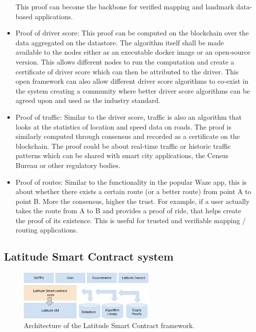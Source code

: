 \begin{itemize}
         This proof can become the backbone for verified mapping and landmark data-based applications.
     \item Proof of driver score: This proof can be computed on the blockchain over the data aggregated on the
         datastore. The algorithm itself shall be made available to the nodes either as an executable docker image or an
         open-source version. This allows different nodes to run the computation and create a certificate of 
         driver score which can then be attributed to the driver. This open framework can also allow different
         driver score algorithms to co-exist in the system creating a community where better driver score algorithms can
         be agreed upon and used as the industry standard.
     \item Proof of traffic:  Similar to the driver score, traffic is also an algorithm that looks at the statistics of
         location and speed data on roads. The proof is similarly computed through consensus and recorded as a
         certificate on the blockchain. The proof could be about real-time traffic or historic traffic patterns which
         can be shared with smart city applications, the Census Bureau or other regulatory bodies.
     \item Proof of routes: Similar to the functionality in the popular Waze app, this is about whether there exists a
         certain route (or a better route) from point A to point B. More the consensus, higher the trust. For example,
         if a user actually takes the route from A to B and provides a proof of ride, that helps create the proof of its existence. This is useful
         for trusted and verifiable mapping / routing applications.
 \end{itemize}

\subsection{Latitude Smart Contract system}

\begin{figure}[t]
    \centering
    \includegraphics[width=0.60\textwidth]{lat_sc.png}
  \caption{Architecture of the Latitude Smart Contract framework.}
    \label{fig:lat-sc}
\end{figure}

